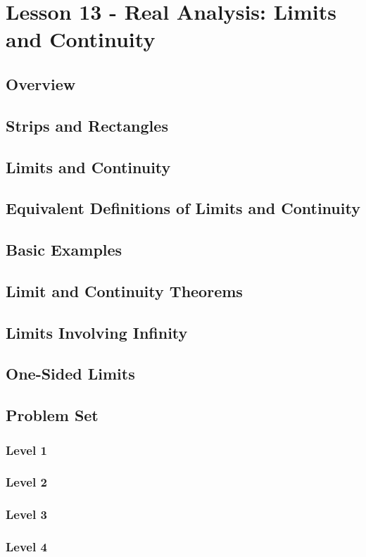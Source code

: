 \documentclass{article}
\begin{document}
\section{Lesson 13 - Real Analysis: Limits and Continuity}
\subsection{Overview}
\subsection{Strips and Rectangles}
\subsection{Limits and Continuity}
\subsection{Equivalent Definitions of Limits and Continuity}
\subsection{Basic Examples}
\subsection{Limit and Continuity Theorems}
\subsection{Limits Involving Infinity}
\subsection{One-Sided Limits}
\subsection{Problem Set}
\subsubsection{Level 1}
\subsubsection{Level 2}
\subsubsection{Level 3}
\subsubsection{Level 4}
\end{document}
